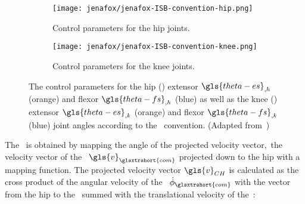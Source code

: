     \begin{figure}[H]%
        \centering%
        \begin{subfigure}{0.5\linewidth}%
            \texttt{[image: jenafox/jenafox-ISB-convention-hip.png]}
            \caption{Control parameters for the hip joints.}
            \label{fig:jenafox-ISB-convention-hip}%
        \end{subfigure}%
        \hfil%
        \begin{subfigure}{0.5\linewidth}%
            \texttt{[image: jenafox/jenafox-ISB-convention-knee.png]}
            \caption{Control parameters for the knee joints.}
            \label{fig:jenafox-ISB-convention-knee}%
        \end{subfigure}%
        \caption{The control parameters for the hip () extensor $\gls{theta-es}_{,h}$ (orange) and flexor $\gls{theta-fs}_{,h}$ (blue) as well as the knee () extensor $\gls{theta-es}_{,k}$ (orange) and flexor $\gls{theta-fs}_{,k}$ (blue) joint angles according to the~ convention. (Adapted from~\cite{Jenafox:ISB})}%
        \label{fig:jenafox-ISB-convention}%
    \end{figure}%
    
    The~ is obtained by mapping the angle of the projected velocity vector,~\ie the velocity vector of the~$~\gls{v}_{\glsxtrshort{com}}$ projected down to the hip with a mapping function. The projected velocity vector$~\gls{v}_{CH}$ is calculated as the cross product of the angular velocity of the~ $\dot{\phi}_{\glsxtrshort{com}}$ with the vector from the hip to the~ summed with the translational velocity of the~:

